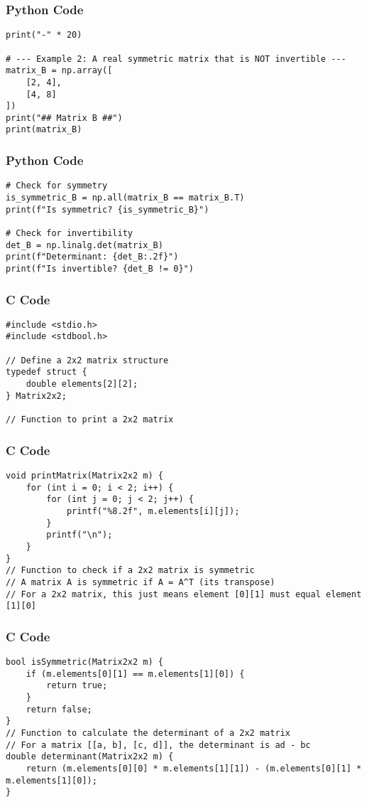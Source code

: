 \documentclass{beamer}
\begin{document}
\begin{frame}[fragile]
\frametitle{Python Code}
\begin{lstlisting}
print("-" * 20)

# --- Example 2: A real symmetric matrix that is NOT invertible ---
matrix_B = np.array([
    [2, 4],
    [4, 8]
])
print("## Matrix B ##")
print(matrix_B)
\end{lstlisting}
\end{frame}

\begin{frame}[fragile]
\frametitle{Python Code}
\begin{lstlisting}
# Check for symmetry
is_symmetric_B = np.all(matrix_B == matrix_B.T)
print(f"Is symmetric? {is_symmetric_B}")

# Check for invertibility
det_B = np.linalg.det(matrix_B)
print(f"Determinant: {det_B:.2f}")
print(f"Is invertible? {det_B != 0}")
\end{lstlisting}
\end{frame}

\begin{frame}[fragile]
\frametitle{C Code}
\begin{lstlisting}
#include <stdio.h>
#include <stdbool.h>

// Define a 2x2 matrix structure
typedef struct {
    double elements[2][2];
} Matrix2x2;

// Function to print a 2x2 matrix
\end{lstlisting}
\end{frame}

\begin{frame}[fragile]
\frametitle{C Code}
\begin{lstlisting}
void printMatrix(Matrix2x2 m) {
    for (int i = 0; i < 2; i++) {
        for (int j = 0; j < 2; j++) {
            printf("%8.2f", m.elements[i][j]);
        }
        printf("\n");
    }
}
// Function to check if a 2x2 matrix is symmetric
// A matrix A is symmetric if A = A^T (its transpose)
// For a 2x2 matrix, this just means element [0][1] must equal element [1][0]
\end{lstlisting}
\end{frame}

\begin{frame}[fragile]
\frametitle{C Code}
\begin{lstlisting}
bool isSymmetric(Matrix2x2 m) {
    if (m.elements[0][1] == m.elements[1][0]) {
        return true;
    }
    return false;
}
// Function to calculate the determinant of a 2x2 matrix
// For a matrix [[a, b], [c, d]], the determinant is ad - bc
double determinant(Matrix2x2 m) {
    return (m.elements[0][0] * m.elements[1][1]) - (m.elements[0][1] * m.elements[1][0]);
}
\end{lstlisting}
\end{frame}
\end{document}

